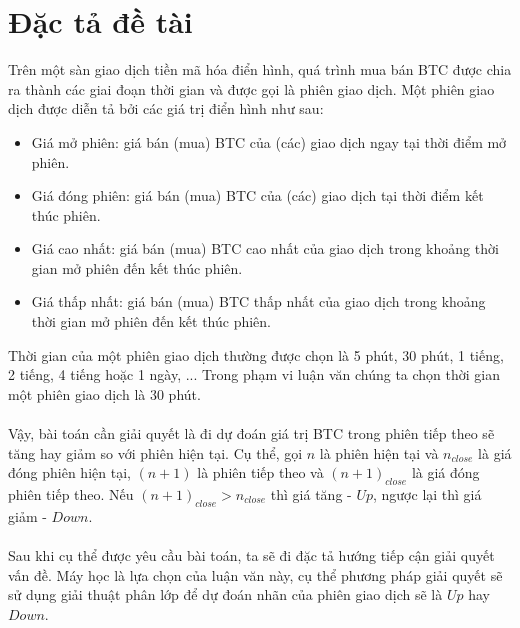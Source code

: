 \section{Đặc tả đề tài}
Trên một sàn giao dịch tiền mã hóa điển hình, quá trình mua bán BTC được chia ra 
thành các giai đoạn thời gian và được gọi là phiên giao dịch. Một phiên giao dịch 
được diễn tả bởi các giá trị điển hình như sau:
\begin{itemize}
\item Giá mở phiên: giá bán (mua) BTC của (các) giao dịch ngay tại thời 
điểm mở phiên.
\item Giá đóng phiên: giá bán (mua) BTC của (các) giao dịch tại thời điểm 
kết thúc phiên.
\item Giá cao nhất: giá bán (mua) BTC cao nhất của giao dịch trong khoảng 
thời gian mở phiên đến kết thúc phiên.
\item Giá thấp nhất: giá bán (mua) BTC thấp nhất của giao dịch trong khoảng 
thời gian mở phiên đến kết thúc phiên.
\end{itemize}
Thời gian của một phiên giao dịch thường được chọn là 5 phút, 30 phút, 1 tiếng, 2 tiếng, 
4 tiếng hoặc 1 ngày, ... 
Trong phạm vi luận văn chúng ta chọn thời gian một phiên giao dịch là 30 phút.\\\\
Vậy, bài toán cần giải quyết là đi dự đoán giá trị BTC trong phiên tiếp theo sẽ tăng 
hay giảm so với phiên hiện tại. Cụ thể, gọi $n$ là phiên hiện tại và $n_{close}$ 
là giá đóng phiên hiện tại, $(n+1)$ là phiên tiếp theo và $(n+1)_{close}$ là giá đóng 
phiên tiếp theo. Nếu $(n+1)_{close} > n_{close}$ thì giá tăng - $Up$, ngược lại thì 
giá giảm - $Down$.\\\\
Sau khi cụ thể được yêu cầu bài toán, ta sẽ đi đặc tả hướng tiếp cận giải quyết 
vấn đề. Máy học là lựa chọn của luận văn này, cụ thể phương pháp giải quyết 
sẽ sử dụng giải thuật phân lớp để dự đoán nhãn của phiên giao dịch sẽ là $Up$ 
hay $Down$.

